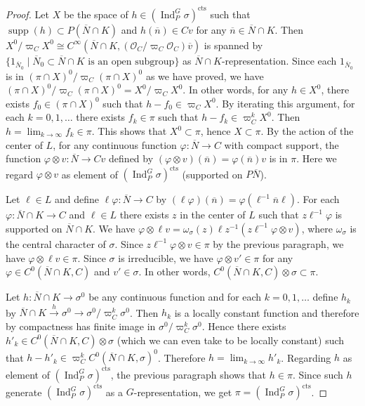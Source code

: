 \documentclass[a4paper]{amsart}
\numberwithin{equation}{section}
\theoremstyle{remark}
\theoremstyle{definition}
\DeclareMathOperator{\Ind}{Ind}
\DeclareMathOperator{\supp}{supp}
\newcommand{\cts}{\mathrm{cts}}
\renewcommand{\simeq}{\cong}
\begin{document}
\begin{proof}
Let $X$ be the space of $h\in (\Ind_{P}^{G}\sigma)^{\cts}$ such that $\supp(h)\subset P(\overline{N}\cap K)$ and $h(\overline{n})\in Cv$ for any $\overline{n}\in \overline{N}\cap K$.
Then $X^{0}/\varpi_{C}X^{0}\simeq C^{\infty}(\overline{N}\cap K,(\mathcal{O}_{C}/\varpi_{C}\mathcal{O}_{C})\overline{v})$ is spanned by $\{1_{\overline{N}_{0}}\mid \text{$\overline{N}_{0}\subset \overline{N}\cap K$ is an open subgroup}\}$ as $\overline{N}\cap K$-representation.
Since each $1_{\overline{N}_{0}}$ is in $(\pi \cap X)^{0}/\varpi_{C}(\pi \cap X)^{0}$ as we have proved, we have $(\pi \cap X)^{0}/\varpi_{C}(\pi \cap X)^{0} = X^{0}/\varpi_{C}X^{0}$.
In other words, for any $h\in X^{0}$, there exists $f_{0}\in (\pi\cap X)^{0}$ such that $h - f_{0}\in \varpi_{C}X^{0}$.
By iterating this argument, for each $k = 0,1,\ldots$ there exists $f_{k}\in \pi$ such that $h - f_{k}\in \varpi_{C}^{k}X^{0}$.
Then $h = \lim_{k\to\infty}f_{k}\in \pi$.
This shows that $X^{0}\subset \pi$, hence $X\subset \pi$.
By the action of the center of $L$, for any continuous function $\varphi\colon \overline{N}\to C$ with compact support, the function $\varphi\otimes v\colon \overline{N}\to Cv$ defined by $(\varphi\otimes v)(\overline{n}) = \varphi(\overline{n})v$ is in $\pi$.
Here we regard $\varphi\otimes v$ as element of $(\Ind_{P}^{G}\sigma)^{\cts}$ (supported on $P\overline{N}$).

Let $\ell\in L$ and define $\ell\varphi\colon \overline{N}\to C$ by $(\ell\varphi)(\overline{n}) = \varphi(\ell^{-1}\overline{n}\ell)$.
For each $\varphi\colon \overline{N}\cap K\to C$ and $\ell\in L$ there exists $z$ in the center of $L$ such that $z\ell^{-1}\varphi$ is supported on $\overline{N}\cap K$.
We have $\varphi\otimes \ell v = \omega_{\sigma}(z)\ell z^{-1}(z\ell^{-1}\varphi\otimes v)$, where $\omega_{\sigma}$ is the central character of $\sigma$.
Since $z\ell^{-1}\varphi\otimes v\in \pi$ by the previous paragraph, we have $\varphi\otimes \ell v\in \pi$.
Since $\sigma$ is irreducible, we have $\varphi\otimes v'\in \pi$ for any $\varphi \in C^0(\overline{N} \cap K,C)$ and $v'\in \sigma$.
In other words, $C^0(\overline{N} \cap K,C) \otimes \sigma \subset \pi$.

Let $h\colon \overline{N}\cap K\to \sigma^{0}$ be any continuous function and for each $k = 0,1,\ldots$ define $h_{k}$ by $\overline{N}\cap K\xrightarrow{h}\sigma^{0}\to \sigma^{0}/\varpi_{C}^{k}\sigma^{0}$.
Then $h_{k}$ is a locally constant function and therefore by compactness has finite image in $\sigma^{0}/\varpi_{C}^{k}\sigma^{0}$.
Hence there exists $h'_{k}\in C^{0}(\overline{N}\cap K,C)\otimes \sigma$ (which we can even take to be locally constant) such that $h - h'_{k}\in \varpi_{C}^{k}C^{0}(\overline{N}\cap K,\sigma)^{0}$.
Therefore $h = \lim_{k\to\infty} h'_{k}$.
Regarding $h$ as element of $(\Ind_{P}^{G}\sigma)^{\cts}$, the previous paragraph shows that $h\in \pi$.
Since such $h$ generate $(\Ind_{P}^{G}\sigma)^{\cts}$ as a $G$-representation, we get $\pi = (\Ind_{P}^{G}\sigma)^{\cts}$.
\end{proof}
\end{document}
